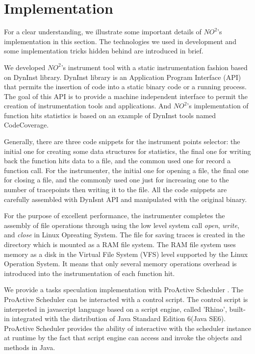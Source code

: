 \section{Implementation} \label{sec-impl}

For a clear understanding, we illustrate some important details of $NO^2$'s implementation
in this section. The technologies we used in development and some implementation tricks
hidden behind are introduced in brief.

We developed $NO^2$'s instrument tool with a static instrumentation fashion based on
DynInst \cite{Dyninst-Deconstruction} library. DynInst library is an Application Program
Interface (API) \cite{dyninstapi} that permits the insertion of code into a static binary
code or a running process. The goal of this API is to provide a machine independent
interface to permit the creation of instrumentation tools and applications. And $NO^2$'s
implementation of function hits statistics is based on an example of DynInst tools named
CodeCoverage.

Generally, there are three code snippets for the instrument points selector: the initial
one for creating some data structures for statistics, the final one for writing back the
function hits data to a file, and the common used one for record a function call. For the
instrumenter, the initial one for opening a file, the final one for closing a file, and
the commonly used one just for increasing one to the number of tracepoints then writing it
to the file. All the code snippets are carefully assembled with DynIsnt API and
manipulated with the original binary.

For the purpose of excellent performance, the instrumenter completes the assembly of file
operations through using the low level system call \emph{open}, \emph{write}, and \emph{close} in
Linux Opreating System. The file for saving traces is created in the directory which is
mounted as a RAM file system. The RAM file system uses memory as a disk in the Virtual
File System (VFS) level supported by the Linux Operation System. It means that only
several memory operations overhead is introduced into the instrumentation of each function
hit.

We provide a tasks speculation implementation with ProActive Scheduler
\cite{pascheduling}. The ProActive Scheduler can be interacted with a control script. The
control script is interpreted in javascript language based on a script engine, called
'Rhino', built-in integrated with the distribution of Java Standard Edition 6(Java SE6).
ProActive Scheduler provides the ability of interactive with the scheduler instance at
runtime by the fact that script engine can access and invoke the objects and methods in
Java.

